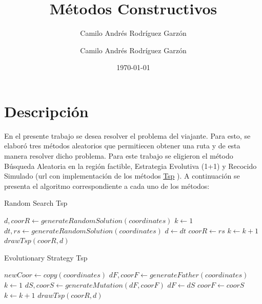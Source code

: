 \documentclass{article}
\title{Métodos Constructivos}
\author{Camilo Andrés Rodríguez Garzón}
\author{Camilo Andrés Rodríguez Garzón}
\date{\today}
\begin{document}
\maketitle

\section{Descripción}
En el presente trabajo se desea resolver el problema del viajante. Para esto, se elaboró tres métodos aleatorios que permitiecen obtener una ruta y de esta manera resolver dicho problema. Para este trabajo se eligieron el método Búsqueda Aleatoria en la región factible, Estrategia Evolutiva (1+1) y Recocido Simulado (url con implementación de los métodos \href{https://github.com/camilorodriguezga/Tsp}{Tsp}
). A continuación se presenta el algoritmo correspondiente a cada uno de los métodos:

\begin{algorithm}[H]
	\caption{Random Search Tsp}\label{RandomSearchTsp}
	\begin{algorithmic}[1]
		\State $d, coorR \gets generateRandomSolution(coordinates)$ 
		\State $k \gets 1$ 
		\State $dt, rs \gets generateRandomSolution(coordinates)$ 
		 
		\State $d \gets dt$
		\State $coorR \gets rs$
		\EndIf
		\State $k \gets k+1$
		\EndWhile\label{euclidendwhile}
		\State $drawTsp(coorR, d)$ 
		\EndProcedure
	\end{algorithmic}
\end{algorithm}

\begin{algorithm}[H]
	\caption{Evolutionary Strategy Tsp}\label{EvolutionaryStrategyTsp}
	\begin{algorithmic}[1]
		\State $newCoor \gets copy(coordinates)$
		\State $dF, coorF \gets generateFather(coordinates)$ 
		\State $k \gets 1$ 
		\State $dS, coorS \gets generateMutation(dF, coorF)$ 
		 
		\State $dF \gets dS$
		\State $coorF \gets coorS$
		\EndIf
		\State $k \gets k+1$
		\EndWhile\label{euclidendwhile}
		\State $drawTsp(coorR, d)$ 
		\EndProcedure
	\end{algorithmic}
\end{algorithm}
\end{document}
